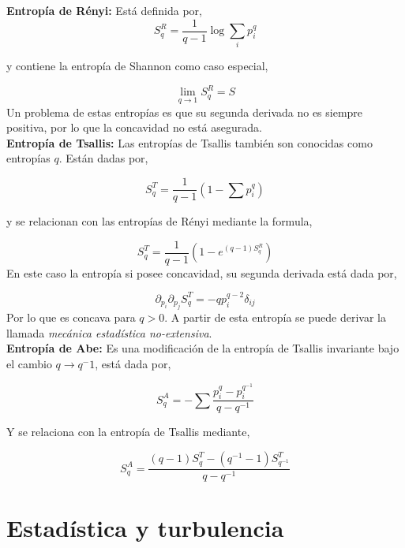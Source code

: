 \documentclass[executivepaper,12pt]{article}
\numberwithin{equation}{section}
\begin{document}
\textbf{Entropía de Rényi:} Está definida por,
\begin{equation*}
	S_q^R=\frac{1}{q-1} \log \sum_i p_i^q
\end{equation*}

y contiene la entropía de Shannon como caso especial,

\begin{equation*}
	\lim_{q\to 1} S_q^R=S
\end{equation*}
Un problema de estas entropías es que  su segunda derivada no es siempre positiva, por lo que la concavidad no está asegurada.\\

\textbf{Entropía de Tsallis:} Las entropías de Tsallis también son conocidas como entropías $q$. Están dadas por,

\begin{equation*}
	S_q^T=\frac{1}{q-1}\left(1-\sum p_i ^q\right)
\end{equation*}

y se relacionan con las entropías de Rényi mediante la formula,

\begin{equation*}
	S_q^T=\frac{1}{q-1}\left(1-e^{(q-1)S_q^R}\right)
\end{equation*}
En este caso la entropía si posee concavidad, su segunda derivada está dada por,

\begin{equation*}
	\partial_{p_i} \partial_{p_j} S_q^T=-qp_i^{q-2} \delta_{ij} 
\end{equation*}
Por lo que es concava para $q>0$. A partir de esta entropía se puede derivar la llamada \textit{mecánica estadística no-extensiva}. \\


\textbf{Entropía de Abe:} Es una modificación de la entropía de Tsallis invariante bajo el cambio $q\to q^-1$, está dada por,

\begin{equation*}
	S^A_q=-\sum\frac{p_i^q-p_i^{q^{-1}}}{q-q^{-1}}
\end{equation*}

Y se relaciona con la entropía de Tsallis mediante,

\begin{equation*}
	S_q^{A}=\frac{(q-1)S^T_q-(q^{-1}-1)S^T_{q^{-1}}}{q-q^{-1}}
\end{equation*}
\pagebreak


\section{Estadística y turbulencia}
\end{document}
